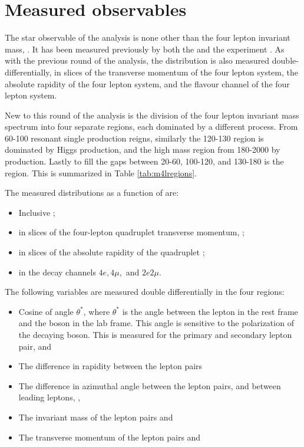 \section{Measured observables}

The star observable of the analysis is none other than the four lepton invariant mass, \mFourL. It has been measured previously by both the \ATLAS and the \CMS experiment  \cite{}. As with the previous round of the analysis, the \mFourL distribution is also measured double-differentially, in slices of the transverse momentum of the four lepton system, the absolute rapidity of the four lepton system, and the flavour channel of the four lepton system. 

New to this round of the analysis is the division of the four lepton invariant mass spectrum into four separate regions, each dominated by a different process. From \unit{60}{\GeV}-\unit{100}{\GeV} resonant single \Z production reigns, similarly the \unit{120}{\GeV}-\unit{130}{\GeV} region is dominated by Higgs production, and the high mass region from \unit{180}{\GeV}-\unit{2000}{\GeV} by \onshellZZ{} production. Lastly to fill the gaps between  \unit{20}{\GeV}-\unit{60}{\GeV}, \unit{100}{\GeV}-\unit{120}{\GeV}, and \unit{130}{\GeV}-\unit{180}{\GeV} is the \offshellZZ{} region. This is summarized in Table \ref{tab:m4lregions}. 

The measured distributions as a function of \mFourL{} are:
\begin{itemize}
    \item Inclusive \mFourL{};
    \item \mFourL{} in slices of the four-lepton quadruplet transverse momentum, \ptFourL{};
    \item \mFourL{} in slices of the absolute rapidity of the quadruplet \yFourL{};
    \item \mFourL{} in the decay channels $4e, 4\mu, $ and $2e2\mu$.
\end{itemize}
The following variables are measured double differentially in the four \mFourL{} regions:
\begin{itemize}
    \item Cosine of angle $\theta^{*}$, where $\theta^{*}$ is the angle between the  lepton in the rest frame and the \Z boson in the lab frame. This angle is sensitive to the polarization of the decaying boson. This is measured for the primary and secondary lepton pair, \CTSOneTwo and \CTSThreeFour
    \item The difference in rapidity between the lepton pairs \dYPairs
    \item The difference in azimuthal angle between the lepton pairs, and between leading leptons, \dPhiPairs, \dPhill
    \item The invariant mass of the lepton pairs \mZOne and \mZTwo
    \item The transverse momentum of the lepton pairs \ptZOne and \ptZTwo
\end{itemize}


